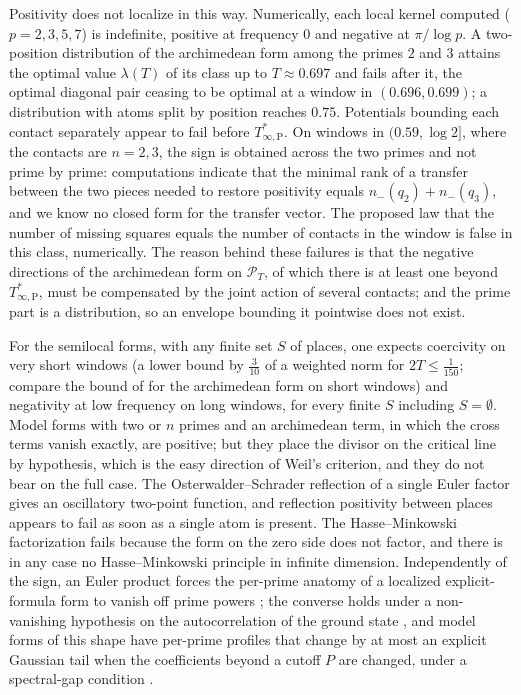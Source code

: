 \documentclass[11pt]{amsart}
\theoremstyle{definition}
\theoremstyle{remark}
\numberwithin{equation}{section}
\newcommand{\PT}{\mathcal{P}_T}                        %
\newcommand{\lam}{\lambda(T)}                          %
\newcommand{\Tarch}{T^{*}_{\infty,\mathrm P}}          %
\begin{document}
Positivity does not localize in this way. Numerically, each local kernel computed ($p=2,3,5,7$) is indefinite,
positive at frequency $0$ and negative at $\pi/\log p$. A two-position distribution of the archimedean form among the
primes $2$ and $3$ attains the optimal value $\lam$ of its class up to $T\approx0.697$ and fails after it, the optimal
diagonal pair ceasing to be optimal at a window in $(0.696,0.699)$; a distribution with atoms split by position reaches
$0.75$. Potentials bounding each contact separately appear to fail before $\Tarch$. On windows in $(0.59,\log2]$, where
the contacts are $n=2,3$, the sign is obtained across the two primes and not prime by prime: computations indicate that
the minimal rank of a transfer between the two pieces needed to restore positivity equals $n_-(q_2)+n_-(q_3)$, and we
know no closed form for the transfer vector. The proposed law that the number of missing squares equals the number of
contacts in the window is false in this class, numerically. The reason behind these failures is that the negative
directions of the archimedean form on $\PT$, of which there is at least one beyond $\Tarch$, must be compensated by the
joint action of several contacts; and the prime part is a distribution, so an envelope bounding it pointwise does not
exist.

For the semilocal forms, with any finite set $S$ of places, one expects coercivity on very short windows (a lower bound
by $\frac3{10}$ of a weighted norm for $2T\le\frac1{150}$; compare the bound of \cite[Theorem~10.9]{P46} for the
archimedean form on short windows) and negativity at low frequency on long windows, for every finite $S$ including
$S=\emptyset$. Model forms with two or $n$ primes and an archimedean term, in which the cross terms vanish exactly, are
positive; but they place the divisor on the critical line by hypothesis, which is the easy direction of Weil's
criterion, and they do not bear on the full case.  The Osterwalder--Schrader reflection \cite{OsterwalderSchrader1973} of a single Euler factor
gives an oscillatory two-point function, and reflection positivity between places appears to fail as soon as a single
atom is present. The Hasse--Minkowski factorization fails because the form on the zero side does not factor, and there
is in any case no Hasse--Minkowski principle in infinite dimension. Independently of the sign, an Euler product forces
the per-prime anatomy of a localized explicit-formula form to vanish off prime powers \cite[Theorem~3.1]{P10}; the
converse holds under a non-vanishing hypothesis on the autocorrelation of the ground state
\cite[Theorems~5.1--5.2]{P10}, and model forms of this shape have per-prime profiles that change by at most an explicit
Gaussian tail when the coefficients beyond a cutoff $P$ are changed, under a spectral-gap condition
\cite[Theorem~4.1]{P09}.
\end{document}
